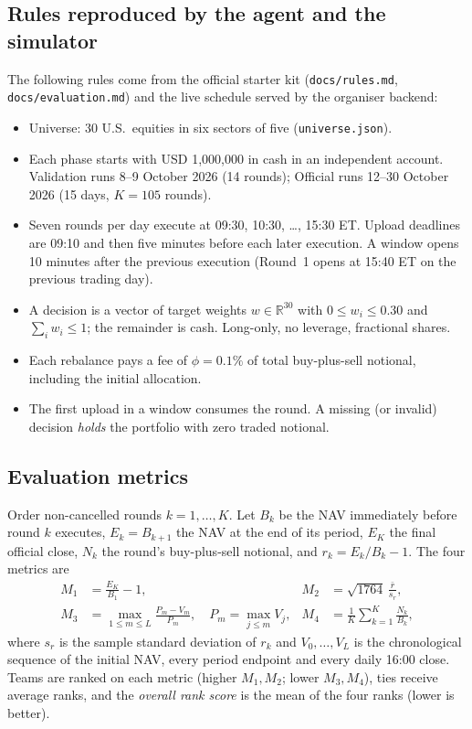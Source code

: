 \documentclass[11pt,a4paper]{article}
\newcommand{\code}[1]{\texttt{#1}}
\newcommand{\R}{\mathbb{R}}
\begin{document}
\subsection{Rules reproduced by the agent and the simulator}
The following rules come from the official starter kit (\code{docs/rules.md}, \code{docs/evaluation.md}) and the live
schedule served by the organiser backend:
\begin{itemize}[nosep]
  \item Universe: 30 U.S.\ equities in six sectors of five (\code{universe.json}).
  \item Each phase starts with USD 1{,}000{,}000 in cash in an independent account. Validation runs 8--9 October 2026
        (14 rounds); Official runs 12--30 October 2026 (15 days, $K=105$ rounds).
  \item Seven rounds per day execute at 09:30, 10:30, \dots, 15:30 ET. Upload deadlines are 09:10 and then five minutes
        before each later execution. A window opens 10 minutes after the previous execution (Round~1 opens at 15:40 ET
        on the previous trading day).
  \item A decision is a vector of target weights $w\in\R^{30}$ with $0\le w_i\le0.30$ and $\sum_i w_i\le1$; the
        remainder is cash. Long-only, no leverage, fractional shares.
  \item Each rebalance pays a fee of $\phi=0.1\%$ of total buy-plus-sell notional, including the initial allocation.
  \item The first upload in a window consumes the round. A missing (or invalid) decision \emph{holds} the portfolio with
        zero traded notional.
\end{itemize}

\subsection{Evaluation metrics}
Order non-cancelled rounds $k=1,\dots,K$. Let $B_k$ be the NAV immediately before round $k$ executes, $E_k=B_{k+1}$ the
NAV at the end of its period, $E_K$ the final official close, $N_k$ the round's buy-plus-sell notional, and
$r_k=E_k/B_k-1$. The four metrics are
\begin{align}
  M_1 &= \frac{E_K}{B_1}-1, &
  M_2 &= \sqrt{1764}\,\frac{\bar r}{s_r}, \\
  M_3 &= \max_{1\le m\le L}\frac{P_m-V_m}{P_m},\quad P_m=\max_{j\le m}V_j, &
  M_4 &= \frac1K\sum_{k=1}^K\frac{N_k}{B_k},
\end{align}
where $s_r$ is the sample standard deviation of $r_k$ and $V_0,\dots,V_L$ is the chronological sequence of the initial NAV,
every period endpoint and every daily 16:00 close. Teams are ranked on each metric (higher $M_1,M_2$; lower $M_3,M_4$),
ties receive average ranks, and the \emph{overall rank score} is the mean of the four ranks (lower is better).
\end{document}
